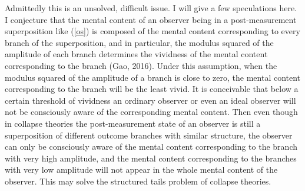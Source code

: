 Admittedly this is an unsolved, difficult issue. I will give a few speculations here.
I conjecture that the mental content of an observer being in a post-measurement superposition like (\ref{os}) is composed of the mental content corresponding to every branch of the superposition, and in particular, the modulus squared of the amplitude of each branch determines the vividness of the mental content corresponding to the branch (Gao, 2016).
Under this assumption, when the modulus squared of the amplitude of a branch is close to zero, the mental content corresponding to the branch will be the least vivid.
It is conceivable that below a certain threshold of vividness an ordinary observer or even an ideal observer will not be consciously aware of the corresponding mental content.
Then even though in collapse theories the post-measurement state of an observer is still a superposition of different outcome branches with similar structure, the observer can only be consciously aware of the  mental content corresponding to the branch with very high amplitude, and the mental content corresponding to the branches with very low amplitude will not appear in the whole mental content of the observer.
This may solve the structured tails problem of collapse theories.





